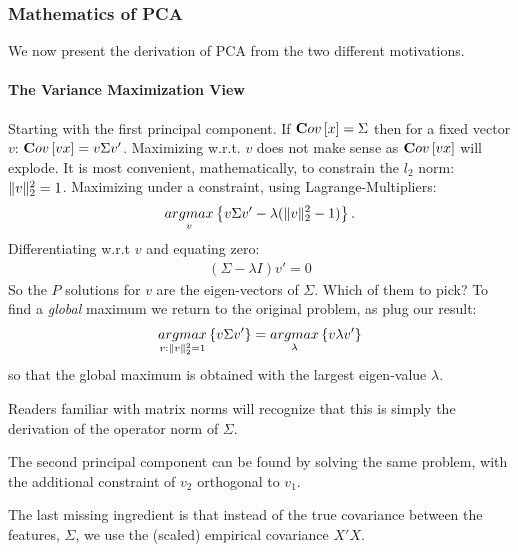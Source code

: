 \subsubsection{Mathematics of PCA}
\label{sec:pca_mathematics}
We now present the derivation of PCA from the two different motivations.




\paragraph{The Variance Maximization View}
Starting with the first principal component.
If $\mathbf{C}ov \left[ x \right]=\Sigma$ then for a fixed vector $v$: $\mathbf{C}ov \left[ vx \right]=v \Sigma v'$.
Maximizing w.r.t. $v$ does not make sense as $\mathbf{C}ov \left[ vx \right]$ will explode. 
It is most convenient, mathematically, to constrain the $l_2$ norm: $\Vert v \Vert_2^2=1$.
Maximizing under a constraint, using Lagrange-Multipliers: 
\begin{align}
 \mathop{argmax}_{v}\left\{ v \Sigma v' - \lambda (\Vert v \Vert_2^2-1) \right\}.
\end{align}
Differentiating w.r.t $v$ and equating zero: 
\begin{align}
	(\Sigma- \lambda I)v'=0
\end{align}
So the $P$ solutions for $v$ are the eigen-vectors of $\Sigma$. Which of them to pick? 
To find a \emph{global} maximum we return to the original problem, as plug our result:
\begin{align}
\label{eq:pca_maximal_variance}
 \mathop{argmax}_{v:\Vert v \Vert_2^2=1}\left\{ v \Sigma v'  \right\}=\mathop{argmax}_{\lambda}\left\{ v \lambda v'  \right\}
\end{align}
so that the global maximum is obtained with the largest eigen-value $\lambda$.

Readers familiar with matrix norms will recognize that this is simply the derivation of the operator norm of $\Sigma$.

The second principal component can be found by solving the same problem, with the additional constraint of $v_2$ orthogonal to $v_1$.

The last missing ingredient is that instead of the true covariance between the features, $\Sigma$, we use the (scaled) empirical covariance $X'X$.




